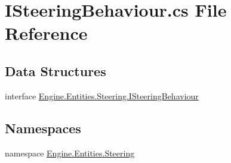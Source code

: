 \hypertarget{a00035}{}\section{I\+Steering\+Behaviour.\+cs File Reference}
\label{a00035}
\subsection*{Data Structures}
\begin{DoxyCompactItemize}
\item 
interface \hyperlink{a00338}{Engine.\+Entities.\+Steering.\+I\+Steering\+Behaviour}
\end{DoxyCompactItemize}
\subsection*{Namespaces}
\begin{DoxyCompactItemize}
\item 
namespace \hyperlink{a00244}{Engine.\+Entities.\+Steering}
\end{DoxyCompactItemize}
